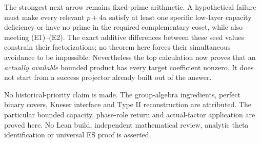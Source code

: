 The strongest next arrow remains fixed-prime arithmetic. A hypothetical
failure must make every relevant $p+4u$ satisfy at least one specific low-layer
capacity deficiency or have no prime in the required complementary coset,
while also meeting (E1)--(E2). The exact additive differences between these
seed values constrain their factorizations; no theorem here forces their
simultaneous avoidance to be impossible. Nevertheless the top calculation
now proves that an \emph{actually available} bounded product has every target
coefficient nonzero. It does not start from a success projector already
built out of the answer.

No historical-priority claim is made. The group-algebra ingredients, perfect
binary covers, Kneser interface and Type II reconstruction are attributed.
The particular bounded capacity, phase-role return and actual-factor
application are proved here. No Lean build, independent mathematical review,
analytic theta identification or universal ES proof is asserted.
